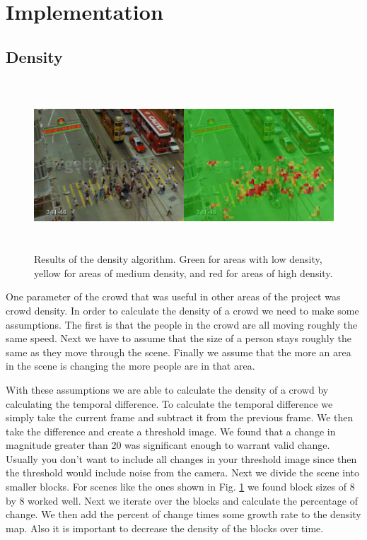 \documentclass[12pt, onecolumn, conference]{IEEEtran}
\begin{document}
\section{Implementation}

\subsection{Density}

\begin{figure}[!t]
\centering
\includegraphics[height=2.5in]{Screenshots/Density.png}
\caption{Results of the density algorithm. Green for areas with low density, yellow for areas of medium density, and red for areas of high density.}
\label{Density}
\end{figure}

One parameter of the crowd that was useful in other areas of the project was crowd density. In order to calculate the density of a crowd we need to make some assumptions. The first is that the people in the crowd are all moving roughly the same speed. Next we have to assume that the size of a person stays roughly the same as they move through the scene. Finally we assume that the more an area in the scene is changing the more people are in that area.

With these assumptions we are able to calculate the density of a crowd by calculating the temporal difference. To calculate the temporal difference we simply take the current frame and subtract it from the previous frame. We then take the difference and create a threshold image. We found that a change in magnitude greater than 20 was significant enough to warrant valid change. Usually you don’t want to include all changes in your threshold image since then the threshold would include noise from the camera. Next we divide the scene into smaller blocks. For scenes like the ones shown in Fig. \ref{Density} we found block sizes of 8 by 8 worked well. Next we iterate over the blocks and calculate the percentage of change. We then add the percent of change times some growth rate to the density map. Also it is important to decrease the density of the blocks over time.
\end{document}
